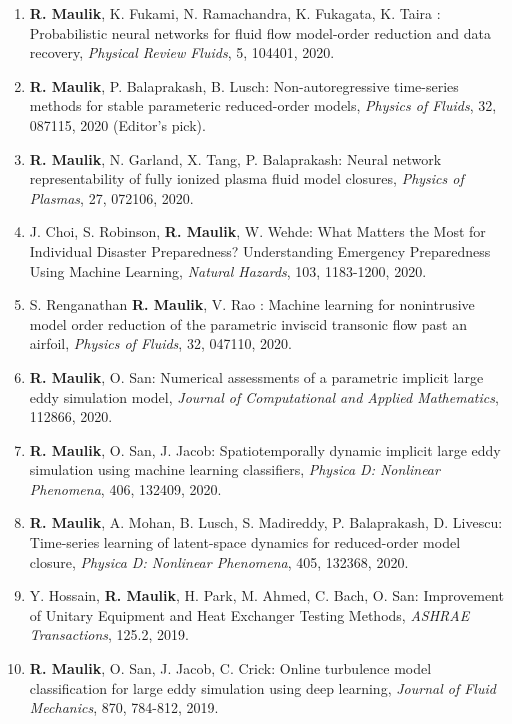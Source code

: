 \documentclass[letterpaper]{article}
\begin{document}
\begin{enumerate}
\item \textbf{R. Maulik}, K. Fukami, N. Ramachandra, K. Fukagata, K. Taira : Probabilistic neural networks for fluid flow model-order reduction and data recovery, {\it Physical Review Fluids}, 5, 104401, 2020. 

\item \textbf{R. Maulik}, P. Balaprakash, B. Lusch: Non-autoregressive time-series methods for stable parameteric reduced-order models, {\it Physics of Fluids}, 32, 087115, 2020 (Editor's pick). 

\item \textbf{R. Maulik}, N. Garland, X. Tang, P. Balaprakash: Neural network representability of fully ionized plasma fluid model closures, {\it Physics of Plasmas}, 27, 072106, 2020.

\item J. Choi, S. Robinson, \textbf{R. Maulik}, W. Wehde: What Matters the Most for Individual Disaster Preparedness? Understanding Emergency Preparedness Using Machine Learning, {\it Natural Hazards}, 103, 1183-1200, 2020. 

\item S. Renganathan \textbf{R. Maulik}, V. Rao : Machine learning for nonintrusive model order reduction of the parametric inviscid transonic flow past an airfoil, {\it Physics of Fluids}, 32, 047110, 2020. 

\item \textbf{R. Maulik}, O. San: Numerical assessments of a parametric implicit large eddy simulation model, {\it Journal of Computational and Applied Mathematics}, 112866, 2020.

\item \textbf{R. Maulik}, O. San, J. Jacob: Spatiotemporally dynamic implicit large eddy simulation using machine learning classifiers, {\it Physica D: Nonlinear Phenomena}, 406, 132409, 2020. 

\item \textbf{R. Maulik}, A. Mohan, B. Lusch, S. Madireddy, P. Balaprakash, D. Livescu: Time-series learning of latent-space dynamics for reduced-order model closure, {\it Physica D: Nonlinear Phenomena}, 405, 132368, 2020. 

\item Y. Hossain, \textbf{R. Maulik}, H. Park, M. Ahmed, C. Bach, O. San: Improvement of Unitary Equipment and Heat Exchanger Testing Methods, {\it ASHRAE Transactions}, 125.2, 2019. 

\item \textbf{R. Maulik}, O. San, J. Jacob, C. Crick: Online turbulence model classification for large eddy simulation using deep learning, {\it Journal of Fluid Mechanics}, 870, 784-812, 2019. 


\end{enumerate}
\end{document}
